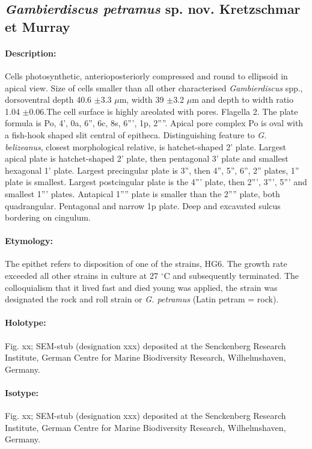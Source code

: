 \documentclass[12pt]{article}
\begin{document}
 \subsection{\emph{Gambierdiscus petramus} sp. nov. Kretzschmar et Murray}
 \paragraph{Description:} Cells photosynthetic, anterioposteriorly compressed and round to ellipsoid in apical view. Size of cells smaller than all other characterised \emph{Gambierdiscus} spp., dorsoventral depth 40.6 $\pm$3.3 $\mu$m, width 39 $\pm$3.2 $\mu$m and depth to width ratio 1.04 $\pm$0.06.The cell surface is highly areolated with pores. Flagella 2. The plate formula is Po, 4', 0a, 6'', 6c, 8s, 6''', 1p, 2''''. 
Apical pore complex Po is oval with a fish-hook shaped slit central of epitheca. Distinguishing feature to \emph{G. belizeanus}, closest morphological relative, is hatchet-shaped 2' plate. Largest apical plate is hatchet-shaped 2' plate, then pentagonal 3' plate and smallest hexagonal 1' plate. Largest precingular plate is 3'', then 4'', 5'', 6'', 2'' plates, 1'' plate is smallest. Largest postcingular plate is the 4''' plate, then 2''', 3''', 5''' and smallest 1''' plates. Antapical 1'''' plate is smaller than the 2'''' plate, both quadrangular. Pentagonal and narrow 1p plate. Deep and excavated sulcus bordering on cingulum.
 \paragraph{Etymology:} The epithet refers to disposition of one of the strains, HG6. The growth rate exceeded all other strains in culture at 27 $^{\circ}$C and subsequently terminated. The colloquialism that it lived fast and died young was applied, the strain was designated the rock and roll strain or \emph{G. petramus} (Latin petram = rock).
\paragraph{Holotype:} Fig. xx; SEM-stub (designation xxx) deposited at the Senckenberg Research Institute, German Centre for Marine Biodiversity Research, Wilhelmshaven, Germany.
\paragraph{Isotype:} Fig. xx; SEM-stub (designation xxx) deposited at the Senckenberg Research Institute, German Centre for Marine Biodiversity Research, Wilhelmshaven, Germany.
\end{document}
